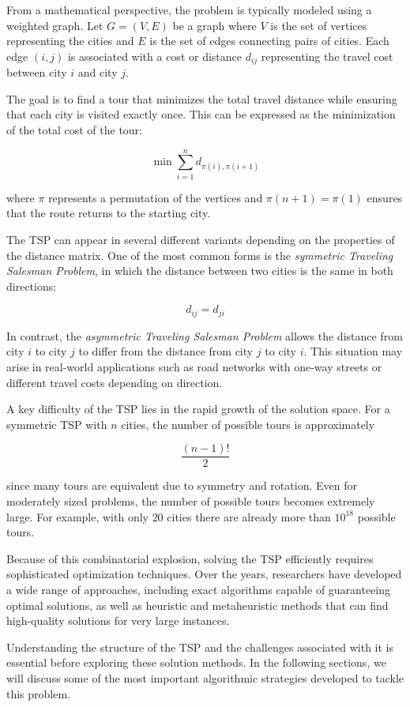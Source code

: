 \documentclass{article}
\begin{document}
From a mathematical perspective, the problem is typically modeled using a weighted graph.
Let $G = (V, E)$ be a graph where $V$ is the set of vertices representing the cities and $E$
is the set of edges connecting pairs of cities. Each edge $(i,j)$ is associated with a cost
or distance $d_{ij}$ representing the travel cost between city $i$ and city $j$.

The goal is to find a tour that minimizes the total travel distance while ensuring that each
city is visited exactly once. This can be expressed as the minimization of the total cost of
the tour:

\[
\min \sum_{i=1}^{n} d_{\pi(i),\pi(i+1)}
\]

where $\pi$ represents a permutation of the vertices and $\pi(n+1) = \pi(1)$ ensures that
the route returns to the starting city.

The TSP can appear in several different variants depending on the properties of the distance
matrix. One of the most common forms is the \textit{symmetric Traveling Salesman Problem},
in which the distance between two cities is the same in both directions:

\[
d_{ij} = d_{ji}
\]

In contrast, the \textit{asymmetric Traveling Salesman Problem} allows the distance from
city $i$ to city $j$ to differ from the distance from city $j$ to city $i$. This situation
may arise in real-world applications such as road networks with one-way streets or different
travel costs depending on direction.

A key difficulty of the TSP lies in the rapid growth of the solution space. For a symmetric
TSP with $n$ cities, the number of possible tours is approximately

\[
\frac{(n-1)!}{2}
\]

since many tours are equivalent due to symmetry and rotation. Even for moderately sized
problems, the number of possible tours becomes extremely large. For example, with only $20$
cities there are already more than $10^{18}$ possible tours.

Because of this combinatorial explosion, solving the TSP efficiently requires sophisticated
optimization techniques. Over the years, researchers have developed a wide range of
approaches, including exact algorithms capable of guaranteeing optimal solutions, as well as
heuristic and metaheuristic methods that can find high-quality solutions for very large
instances.

Understanding the structure of the TSP and the challenges associated with it is essential
before exploring these solution methods. In the following sections, we will discuss some of
the most important algorithmic strategies developed to tackle this problem.
\end{document}
